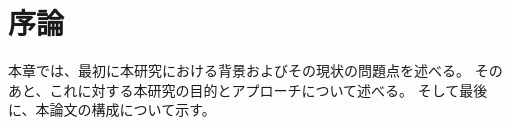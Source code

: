 
\renewcommand{\part}{Contents}
\renewcommand{\prechaptername}{第 }
\renewcommand{\postchaptername}{ 章}

\chapter{序論}
 
本章では、最初に本研究における背景およびその現状の問題点を述べる。
そのあと、これに対する本研究の目的とアプローチについて述べる。
そして最後に、本論文の構成について示す。

